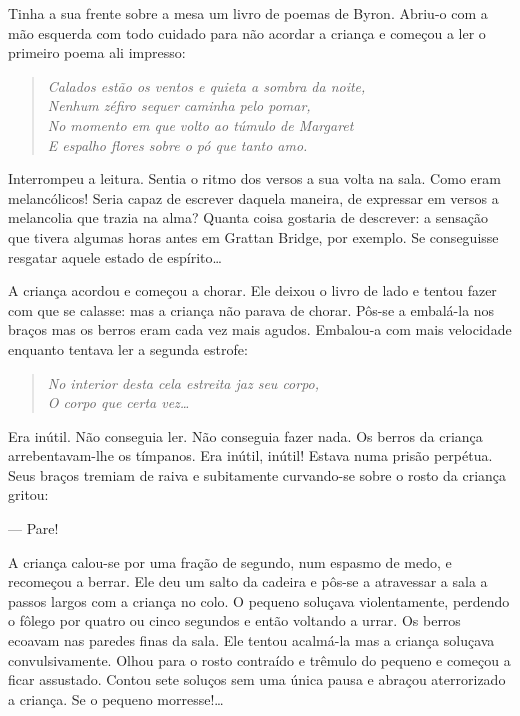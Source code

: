 Tinha a sua frente sobre a mesa um livro de poemas de Byron.  Abriu-o com a mão
esquerda com todo cuidado para não acordar a criança e começou a ler o primeiro
poema ali impresso:

\begin{verse}\itshape
Calados estão os ventos e quieta a sombra da noite,\\
Nenhum zéfiro sequer caminha pelo pomar,\\
No momento em que volto ao túmulo de Margaret\\
E espalho flores sobre o pó que tanto amo.
\end{verse}

Interrompeu a leitura.  Sentia o ritmo dos versos a sua volta na sala.  Como
eram melancólicos!  Seria capaz de escrever daquela maneira, de expressar em
versos a melancolia que trazia na alma?  Quanta coisa gostaria de descrever: a
sensação que tivera algumas horas antes em Grattan Bridge, por exemplo.  Se
conseguisse resgatar aquele estado de espírito\ldots{}

A criança acordou e começou a chorar.  Ele deixou o livro de lado e tentou
fazer com que se calasse: mas a criança não parava de chorar.  Pôs-se a
embalá-la nos braços mas os berros eram cada vez mais agudos.  Embalou-a com
mais velocidade enquanto tentava ler a segunda estrofe:

\begin{verse}\itshape
No interior desta cela estreita jaz seu corpo,\\
O corpo que certa vez\ldots{}
\end{verse}

Era inútil.  Não conseguia ler.  Não conseguia fazer nada.  Os berros da
criança arrebentavam-lhe os tímpanos.  Era inútil, inútil!  Estava numa prisão
perpétua.  Seus braços tremiam de raiva e subitamente curvando-se sobre o rosto
da criança gritou:

--- Pare!

A criança calou-se por uma fração de segundo, num espasmo de medo, e recomeçou
a berrar.  Ele deu um salto da cadeira e pôs-se a atravessar a sala a passos
largos com a criança no colo.  O pequeno soluçava violentamente, perdendo o
fôlego por quatro ou cinco segundos e então voltando a urrar.  Os berros
ecoavam nas paredes finas da sala.  Ele tentou acalmá-la mas a criança soluçava
convulsivamente.  Olhou para o rosto contraído e trêmulo do pequeno e começou a
ficar assustado.  Contou sete soluços sem uma única pausa e abraçou
aterrorizado a criança.  Se o pequeno morresse!\ldots{}

